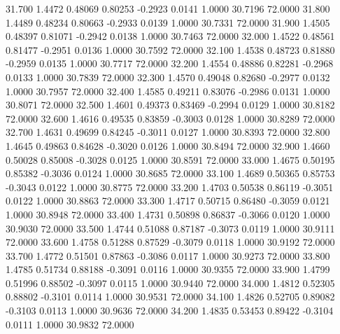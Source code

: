   31.700   1.4472   0.48069   0.80253  -0.2923   0.0141   1.0000  30.7196  72.0000
  31.800   1.4489   0.48234   0.80663  -0.2933   0.0139   1.0000  30.7331  72.0000
  31.900   1.4505   0.48397   0.81071  -0.2942   0.0138   1.0000  30.7463  72.0000
  32.000   1.4522   0.48561   0.81477  -0.2951   0.0136   1.0000  30.7592  72.0000
  32.100   1.4538   0.48723   0.81880  -0.2959   0.0135   1.0000  30.7717  72.0000
  32.200   1.4554   0.48886   0.82281  -0.2968   0.0133   1.0000  30.7839  72.0000
  32.300   1.4570   0.49048   0.82680  -0.2977   0.0132   1.0000  30.7957  72.0000
  32.400   1.4585   0.49211   0.83076  -0.2986   0.0131   1.0000  30.8071  72.0000
  32.500   1.4601   0.49373   0.83469  -0.2994   0.0129   1.0000  30.8182  72.0000
  32.600   1.4616   0.49535   0.83859  -0.3003   0.0128   1.0000  30.8289  72.0000
  32.700   1.4631   0.49699   0.84245  -0.3011   0.0127   1.0000  30.8393  72.0000
  32.800   1.4645   0.49863   0.84628  -0.3020   0.0126   1.0000  30.8494  72.0000
  32.900   1.4660   0.50028   0.85008  -0.3028   0.0125   1.0000  30.8591  72.0000
  33.000   1.4675   0.50195   0.85382  -0.3036   0.0124   1.0000  30.8685  72.0000
  33.100   1.4689   0.50365   0.85753  -0.3043   0.0122   1.0000  30.8775  72.0000
  33.200   1.4703   0.50538   0.86119  -0.3051   0.0122   1.0000  30.8863  72.0000
  33.300   1.4717   0.50715   0.86480  -0.3059   0.0121   1.0000  30.8948  72.0000
  33.400   1.4731   0.50898   0.86837  -0.3066   0.0120   1.0000  30.9030  72.0000
  33.500   1.4744   0.51088   0.87187  -0.3073   0.0119   1.0000  30.9111  72.0000
  33.600   1.4758   0.51288   0.87529  -0.3079   0.0118   1.0000  30.9192  72.0000
  33.700   1.4772   0.51501   0.87863  -0.3086   0.0117   1.0000  30.9273  72.0000
  33.800   1.4785   0.51734   0.88188  -0.3091   0.0116   1.0000  30.9355  72.0000
  33.900   1.4799   0.51996   0.88502  -0.3097   0.0115   1.0000  30.9440  72.0000
  34.000   1.4812   0.52305   0.88802  -0.3101   0.0114   1.0000  30.9531  72.0000
  34.100   1.4826   0.52705   0.89082  -0.3103   0.0113   1.0000  30.9636  72.0000
  34.200   1.4835   0.53453   0.89422  -0.3104   0.0111   1.0000  30.9832  72.0000
